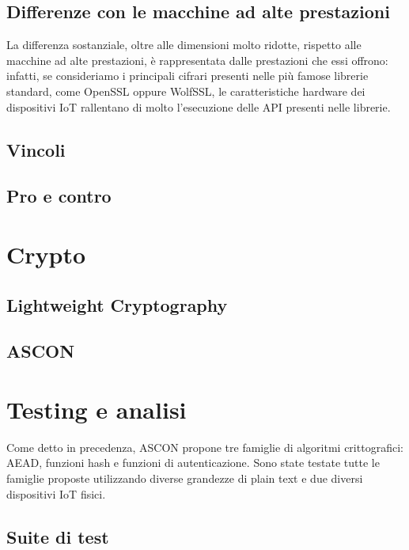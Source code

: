 \documentclass{report}
\begin{document}
\section{Differenze con le macchine ad alte prestazioni}

La differenza sostanziale, oltre alle dimensioni molto ridotte, rispetto alle macchine ad alte prestazioni, è rappresentata dalle prestazioni che essi offrono: infatti, se consideriamo i principali cifrari presenti nelle più famose librerie standard, come OpenSSL oppure WolfSSL, le caratteristiche hardware dei dispositivi IoT rallentano di molto l'esecuzione delle API presenti nelle librerie. 

\section{Vincoli}

\section{Pro e contro}

\newpage

\chapter{Crypto}

\section{Lightweight Cryptography}

\section{ASCON}

\newpage

\chapter{Testing e analisi}

Come detto in precedenza, ASCON propone tre famiglie di algoritmi crittografici: AEAD, funzioni hash e funzioni di autenticazione. Sono state testate tutte le famiglie proposte utilizzando diverse grandezze di plain text e due diversi dispositivi IoT fisici.

\section{Suite di test}
\end{document}

